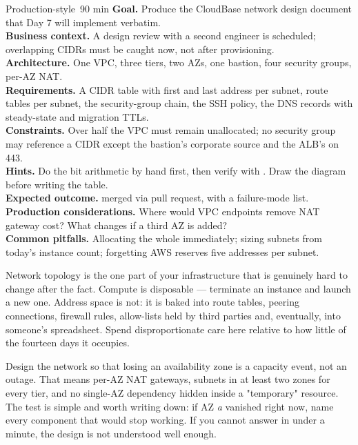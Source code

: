 \begin{minilab}{Production-style}{~90 min}
\textbf{Goal.} Produce the CloudBase network design document that Day 7 will implement verbatim.\\
\textbf{Business context.} A design review with a second engineer is scheduled; overlapping CIDRs must be caught now, not after provisioning.\\
\textbf{Architecture.} One  VPC, three tiers, two AZs, one bastion, four security groups, per-AZ NAT.\\
\textbf{Requirements.} A CIDR table with first and last address per subnet, route tables per subnet, the security-group chain, the SSH policy, the DNS records with steady-state and migration TTLs.\\
\textbf{Constraints.} Over half the VPC must remain unallocated; no security group may reference a CIDR except the bastion's corporate source and the ALB's  on 443.\\
\textbf{Hints.} Do the bit arithmetic by hand first, then verify with . Draw the diagram before writing the table.\\
\textbf{Expected outcome.}  merged via pull request, with a failure-mode list.\\
\textbf{Production considerations.} Where would VPC endpoints remove NAT gateway cost? What changes if a third AZ is added?\\
\textbf{Common pitfalls.} Allocating the whole  immediately; sizing subnets from today's instance count; forgetting AWS reserves five addresses per subnet.
\end{minilab}


\begin{infranote}
Network topology is the one part of your infrastructure that is genuinely hard to change after the fact. Compute is disposable --- terminate an instance and launch a new one. Address space is not: it is baked into route tables, peering connections, firewall rules, allow-lists held by third parties and, eventually, into someone's spreadsheet. Spend disproportionate care here relative to how little of the fourteen days it occupies.
\end{infranote}

\begin{reliability}
Design the network so that losing an availability zone is a capacity event, not an outage. That means per-AZ NAT gateways, subnets in at least two zones for every tier, and no single-AZ dependency hidden inside a "temporary" resource. The test is simple and worth writing down: if AZ \emph{a} vanished right now, name every component that would stop working. If you cannot answer in under a minute, the design is not understood well enough.
\end{reliability}

